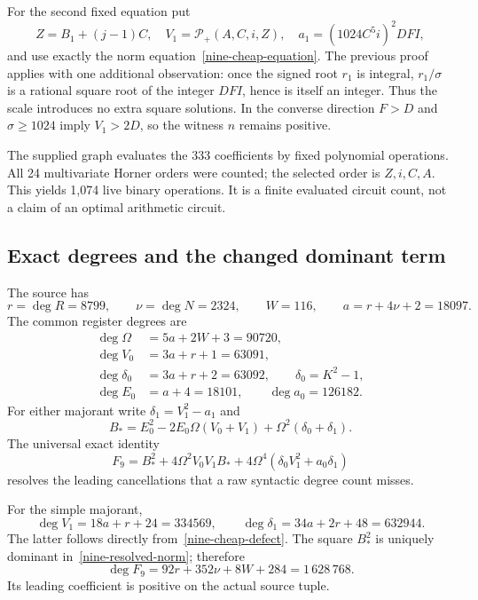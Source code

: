 For the second fixed equation put
\[
 Z=B_1+(j-1)C,\quad
 V_1=\mathcal P_+(A,C,i,Z),\quad a_1=(1024C^5i)^2DFI,
\]
and use exactly the norm equation~\eqref{nine-cheap-equation}.
The previous proof applies with one additional observation: once the
signed root $r_1$ is integral, $r_1/\sigma$ is a rational square root of
the integer $DFI$, hence is itself an integer.  Thus the scale introduces
no extra square solutions.  In the converse direction $F>D$ and
$\sigma\ge1024$ imply $V_1>2D$, so the witness $n$ remains positive.

The supplied graph evaluates the 333 coefficients by fixed polynomial
operations.  All 24 multivariate Horner orders were counted; the selected
order is $Z,i,C,A$.  This yields 1,074 live binary operations.  It is a
finite evaluated circuit count, not a claim of an optimal arithmetic circuit.

\subsection{Exact degrees and the changed dominant term}

The source has
\[
 r=\deg R=8799,\qquad \nu=\deg N=2324,\qquad W=116,
 \qquad a=r+4\nu+2=18097.
\]
The common register degrees are
\begin{align*}
 \deg\Omega&=5a+2W+3=90720,\\
 \deg V_0&=3a+r+1=63091,\\
 \deg\delta_0&=3a+r+2=63092,\qquad \delta_0=K^2-1,\\
 \deg E_0&=a+4=18101,\qquad\deg a_0=126182.
\end{align*}
For either majorant write $\delta_1=V_1^2-a_1$ and
\[
 B_* =E_0^2-2E_0\Omega(V_0+V_1)+\Omega^2(\delta_0+\delta_1).
\]
The universal exact identity
\begin{equation}
 F_9=B_*^2+4\Omega^2V_0V_1B_*
           +4\Omega^4(\delta_0V_1^2+a_0\delta_1)
 \label{nine-resolved-norm}
\end{equation}
resolves the leading cancellations that a raw syntactic degree count misses.

For the simple majorant,
\[
 \deg V_1=18a+r+24=334569,
 \qquad\deg\delta_1=34a+2r+48=632944.
\]
The latter follows directly from~\eqref{nine-cheap-defect}.  The square
$B_*^2$ is uniquely dominant in~\eqref{nine-resolved-norm}; therefore
\[
 \deg F_9=92r+352\nu+8W+284=1\,628\,768.
\]
Its leading coefficient is positive on the actual source tuple.

